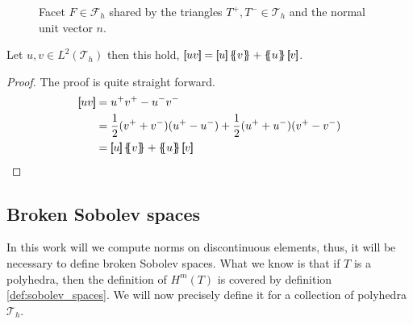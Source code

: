 \begin{figure}[!h]
\centering
{}

\caption{Facet $F \in \mathcal{F}_h $ shared by the triangles $T^{+}, T^{-} \in \mathcal{T}_{h} $ and the normal unit vector $n$.  }
    \label{fig:normal}
\end{figure}

\begin{lemma}
    \label{lemma:magic_formula}
    Let $u,v \in L^2( \mathcal{T}_{h} ) $ then this hold,
    $  \jump{ uv }    = \jump{ u }   \mean{ v }    + \mean{ u }  \jump{ v }     $.
\end{lemma}
\begin{proof}
    The proof is quite straight forward.
    \[
        \begin{split}
    \jump{ uv }   & = u^{+}v^{+} - u^{-}v^{-} \\
     & =  \frac{1}{2}(v^{+} + v^{-})( u^{+} - u^{-})+ \frac{1}{2}(u^{+} + u^{-})( v^{+} - v^{-})   \\
     & =  \jump{ u }   \mean{ v }    + \mean{ u }  \jump{ v }
        \end{split}
    \]
\end{proof}


\subsection{Broken Sobolev spaces}%
\label{sub:broken_sobolev_spaces}

In this work will we compute norms on discontinuous elements, thus, it will be necessary to define broken Sobolev spaces. What we know is that if $T$ is a polyhedra, then the definition of $H^{m}( T)$ is covered by definition
\ref{def:sobolev_spaces}. We will now precisely define it for a collection of polyhedra $\mathcal{T}_{h}$.

